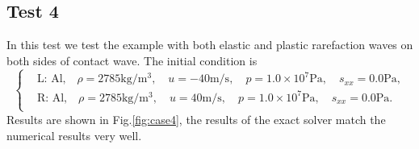 \documentclass[review]{elsarticle}
\numberwithin{equation}{section}
\numberwithin{table}{section}
\begin{document}
\subsection{Test 4}
In this test we test the example with both elastic and plastic rarefaction waves on both sides of contact wave. The initial condition is
\begin{equation}
 \left\{ \begin{aligned}
	 &	 \text{L: Al,}\quad  \rho = 2785 \text{kg}/\text{m}^3, \quad  u = -40\text{m}/\text{s}, \quad  p = 1.0\times 10^7 \text{Pa}, \quad  s_{xx}=0.0 \text{Pa},\\
	 &	 \text{R: Al,}\quad  \rho = 2785 \text{kg}/\text{m}^3, \quad  u = 40\text{m}/\text{s}, \quad  p = 1.0\times 10^7\text{Pa}, \quad  s_{xx}=0.0 \text{Pa}.\\
   \end{aligned}
 \right.
\end{equation}
Results are shown in Fig.\ref{fig:case4},  the results of the exact solver match the numerical results very well.
\end{document}
